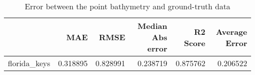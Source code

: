 \begin{table}[h!]
\caption{Error between the point bathymetry and ground-truth data}
\label{tab:florida_keys_lidar_error}
\begin{tabular}{lrrrrr}
\toprule
 & MAE & RMSE & Median Abs error & R2 Score & Average Error \\
\midrule
florida_keys & 0.318895 & 0.828991 & 0.238719 & 0.875762 & 0.206522 \\
\bottomrule
\end{tabular}
\end{table}
